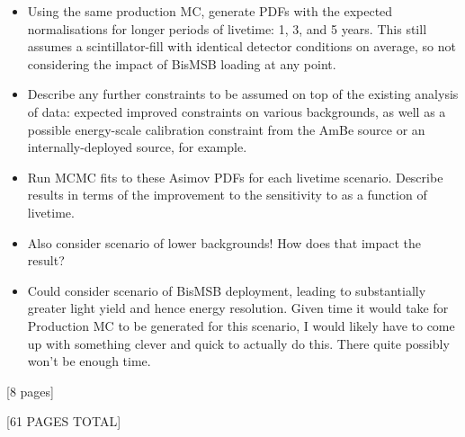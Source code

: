 {
    \color{blue}
    \begin{itemize}
        \item Using the same production MC, generate PDFs with the expected normalisations for longer periods of livetime: 1, 3, and 5 years. This still assumes a scintillator-fill with identical detector conditions on average, so not considering the impact of BisMSB loading at any point.
        \item Describe any further constraints to be assumed on top of the existing analysis of data: expected improved constraints on various backgrounds, as well as a possible energy-scale calibration constraint from the AmBe source or an internally-deployed source, for example.
        \item Run MCMC fits to these Asimov PDFs for each livetime scenario. Describe results in terms of the improvement to the sensitivity to \tonetwo{} as a function of livetime.
        \item Also consider scenario of lower backgrounds! How does that impact the result?
        \item Could consider scenario of BisMSB deployment, leading to substantially greater light yield and hence energy resolution. Given time it would take for Production MC to be generated for this scenario, I would likely have to come up with something clever and quick to actually do this. There quite possibly won't be enough time.
    \end{itemize}
    [8 pages]

    [61 PAGES TOTAL]
}